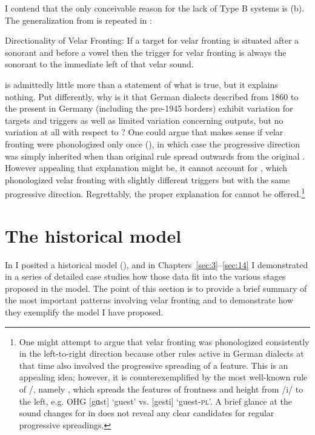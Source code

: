 I contend that the only conceivable reason for the lack of Type B systems is (b). The generalization from  is repeated in :

\eanoraggedright%
\label{ex:16:4}Directionality of Velar Fronting: If a target for velar fronting is situated after a sonorant and before a vowel then the trigger for velar fronting is always the sonorant to the immediate left of that velar sound.
\z 

 is admittedly little more than a statement of what is true, but it explains nothing. Put differently, why is it that German dialects described from 1860 to the present in Germany (including the pre-1945 borders) exhibit variation for targets and triggers as well as limited variation concerning outputs, but no variation at all with respect to ? One could argue that  makes sense if velar fronting were phonologized only once (), in which case the progressive direction was simply inherited when than original rule spread outwards from the original . However appealing that explanation might be, it cannot account for , which phonologized velar fronting with slightly different triggers but with the same progressive direction. Regrettably, the proper explanation for  cannot be offered.\footnote{{One might attempt to argue that velar fronting was phonologized consistently in the left-to-right direction because other rules active in German dialects at that time also involved the progressive spreading of a feature. This is an appealing idea; however, it is counterexemplified by the most well-known rule of /, namely , which spreads the features of frontness and height from /i/ to the left, e.g. OHG [gɑst] ‘guest’ vs. [gesti] ‘guest-\textsc{pl}’. A brief glance at the sound changes for  in \citet{Braune2004} does not reveal any clear candidates for regular progressive spreadings.}}

\section{{The} {historical} {model}}\label{sec:16.6}

In  I posited a historical model (), and in Chapters~\ref{sec:3}--\ref{sec:14} I demonstrated in a series of detailed case studies how those data fit into the various stages proposed in the model. The point of this section is to provide a brief summary of the most important patterns involving velar fronting and to demonstrate how they exemplify the model I have proposed.

